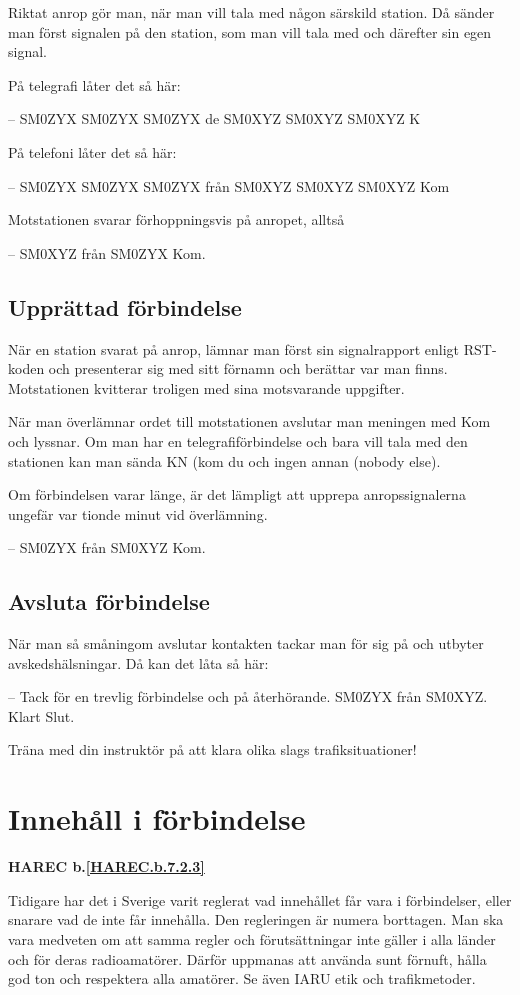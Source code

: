 Riktat anrop gör man, när man vill tala med någon särskild station.
Då sänder man först signalen på den station, som man vill tala med och
därefter sin egen signal.

På telegrafi låter det så här:

-- SM0ZYX SM0ZYX SM0ZYX de SM0XYZ SM0XYZ SM0XYZ K

På telefoni låter det så här:

-- SM0ZYX SM0ZYX SM0ZYX från SM0XYZ SM0XYZ SM0XYZ Kom

Motstationen svarar förhoppningsvis på anropet, alltså

-- SM0XYZ från SM0ZYX Kom.

\subsection{Upprättad förbindelse}

När en station svarat på anrop, lämnar man först sin signalrapport
enligt RST-koden och presenterar sig med sitt förnamn och berättar var man finns.
Motstationen kvitterar troligen med sina motsvarande uppgifter.

När man överlämnar ordet till motstationen avslutar man meningen med Kom och lyssnar.
Om man har en telegrafiförbindelse och bara vill tala med den stationen kan man
sända KN (kom du och ingen annan (nobody else).

Om förbindelsen varar länge, är det lämpligt att upprepa anropssignalerna ungefär var tionde minut vid överlämning.

-- SM0ZYX från SM0XYZ Kom.

\subsection{Avsluta förbindelse}

När man så småningom avslutar kontakten tackar man för sig på och
utbyter avskedshälsningar. Då kan det låta så här:

-- Tack för en trevlig förbindelse och på återhörande. SM0ZYX från
SM0XYZ. Klart Slut.

Träna med din instruktör på att klara olika slags trafiksituationer!

\section{Innehåll i förbindelse}
\textbf{HAREC
  b.\ref{HAREC.b.7.2.3}\label{myHAREC.b.7.2.3}
}

Tidigare har det i Sverige varit reglerat vad innehållet får vara i
förbindelser, eller snarare vad de inte får innehålla.
Den regleringen är numera borttagen.
Man ska vara medveten om att samma regler och förutsättningar inte gäller i alla
länder och för deras radioamatörer.
Därför uppmanas att använda sunt förnuft, hålla god ton och respektera alla
amatörer. Se även IARU etik och trafikmetoder.

